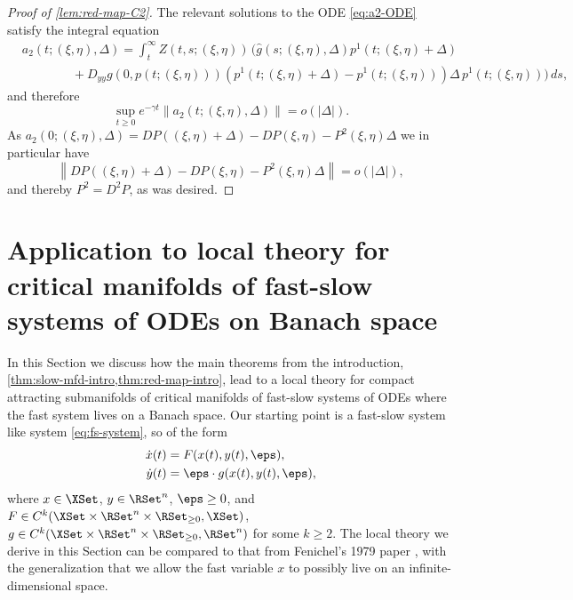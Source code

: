\documentclass[a4paper]{siamart190516}
\begin{document}
\begin{proof}[Proof of \cref{lem:red-map-C2}]
The relevant solutions to the ODE \cref{eq:a2-ODE} satisfy the integral equation
\begin{align*}
 &a_2(t; (\xi,\eta), \Delta) =   \int_t^{\infty} Z(t,s; (\xi,\eta)) \, \bigg( \hat{g}(s; (\xi,\eta), \Delta) p^1(t; (\xi,\eta) + \Delta)  \\
 &\qquad \qquad + D_{yy} g(0,p(t;(\xi,\eta))) \left( p^1(t; (\xi,\eta) + \Delta)  - p^1(t;(\xi,\eta)) \right) \Delta \, p^1(t;(\xi,\eta))  \bigg) \, ds,
\end{align*}
and therefore
\[
\sup_{t \geq 0} e^{-\gamma t} \|  a_2(t; (\xi,\eta), \Delta)  \| = o(|\Delta|).
\]
As $a_2(0; (\xi,\eta), \Delta) = DP((\xi,\eta)+\Delta) - DP(\xi,\eta) - P^2(\xi,\eta) \Delta$ we in particular have
\[
\left\| DP((\xi,\eta)+\Delta) - DP(\xi,\eta) - P^2(\xi,\eta) \Delta \right\| =   o(|\Delta|),
\]
and thereby $P^2 = D^2 P$, as was desired. 
\end{proof}







 
 \section{Application to local theory for critical manifolds of fast-slow systems of ODEs on Banach space}\label{sec:application}
 
In this Section we discuss how the main theorems from the introduction,
\cref{thm:slow-mfd-intro,thm:red-map-intro}, lead to a local theory for
compact attracting submanifolds of critical manifolds of fast-slow systems of ODEs
where the fast system lives on a Banach space. Our starting point is a fast-slow
system like system \cref{eq:fs-system}, so of the form
 \begin{align}
 \begin{split}\label{eq:fs-system-app}
 \dot{x}(t) &= F(x(t),y(t),\eps), \\
 \dot{y}(t) &= \eps \cdot g(x(t),y(t), \eps),
 \end{split}
 \end{align}
where $x \in \XSet$, $y \in \RSet^n$, $\eps \geq 0$, and $F \in C^{k}(\XSet \times \RSet^n \times \RSet_{\geq 0},\XSet)$, $g \in C^k(\XSet \times \RSet^n \times \RSet_{\geq 0},\RSet^n)$ for some $k \geq 2$. The local theory we derive in this Section can be compared to that from Fenichel's 1979 paper \cite{Fe79, Ku15}, with the generalization that we allow the fast variable $x$ to possibly live on an infinite-dimensional space. 
\end{document}
